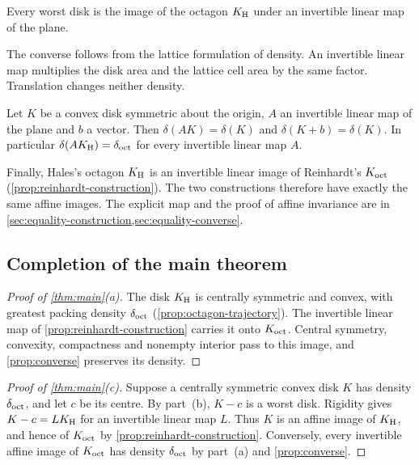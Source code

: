 \begin{theorem}[Rigidity]\label{thm:rigidity}
Every worst disk is the image of the octagon $K_{\mathrm{H}}$ under an invertible linear map of the plane.
\end{theorem}

The converse follows from the lattice formulation of density. An invertible linear map
multiplies the disk area and the lattice cell area by the same factor. Translation changes
neither density.

\begin{proposition}\label{prop:converse}
Let $K$ be a convex disk symmetric about the origin, $A$ an invertible linear map of the plane and
$b$ a vector. Then $\delta(AK)=\delta(K)$ and $\delta(K+b)=\delta(K)$. In particular
$\delta(AK_{\mathrm{H}})=\delta_{\mathrm{oct}}$ for every invertible linear map $A$.
\end{proposition}

Finally, Hales's octagon $K_{\mathrm{H}}$ is an invertible linear image of Reinhardt's $K_{\mathrm{oct}}$
(\cref{prop:reinhardt-construction}). The two constructions therefore have exactly the same
affine images. The explicit map and the proof of affine invariance are in
\cref{sec:equality-construction,sec:equality-converse}.

\subsection{Completion of the main theorem}\label{sec:equality-proofs}

\begin{proof}[Proof of \cref{thm:main}\textup{(a)}]
The disk $K_{\mathrm{H}}$ is centrally symmetric and convex, with greatest packing density $\delta_{\mathrm{oct}}$
(\cref{prop:octagon-trajectory}). The invertible linear map of
\cref{prop:reinhardt-construction} carries it onto $K_{\mathrm{oct}}$. Central symmetry, convexity,
compactness and nonempty interior pass to this image, and \cref{prop:converse} preserves its
density.
\end{proof}

\begin{proof}[Proof of \cref{thm:main}\textup{(c)}]
Suppose a centrally symmetric convex disk $K$ has density $\delta_{\mathrm{oct}}$, and let $c$ be its centre.
By part~(b), $K-c$ is a worst disk. Rigidity gives $K-c=LK_{\mathrm{H}}$ for an invertible linear map $L$.
Thus $K$ is an affine image of $K_{\mathrm{H}}$, and hence of $K_{\mathrm{oct}}$ by
\cref{prop:reinhardt-construction}. Conversely, every invertible affine image of $K_{\mathrm{oct}}$ has
density $\delta_{\mathrm{oct}}$ by part~(a) and \cref{prop:converse}.
\end{proof}
